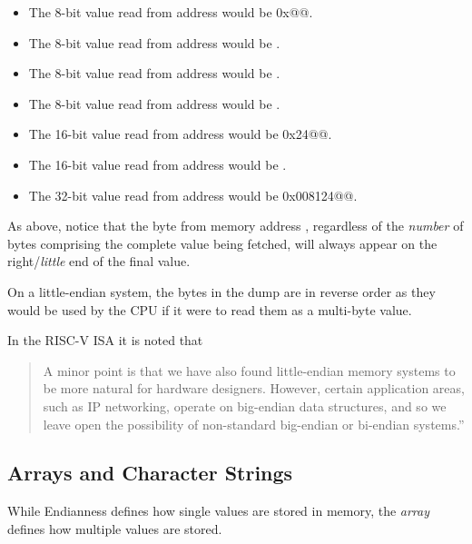 \begin{itemize}
\item The 8-bit value read from address \colorbox{c_lightgreen}{} would be \verb@0x@{\color{red}@}.
\item The 8-bit value read from address  would be .
\item The 8-bit value read from address  would be .
\item The 8-bit value read from address  would be .
\item The 16-bit value read from address \colorbox{c_lightgreen}{} would be \verb@0x24@{\color{red}@}.
\item The 16-bit value read from address  would be .
\item The 32-bit value read from address \colorbox{c_lightgreen}{} would be \verb@0x008124@{\color{red}@}.
\end{itemize}

As above, notice that the byte from memory address \colorbox{c_lightgreen}{}, 
regardless of the {\em number} of bytes comprising the complete value being 
fetched, will always appear on the right/{\em little} end of the final value.



\begin{tcolorbox}
On a little-endian system, the bytes in the dump are in reverse order as 
they would be used by the CPU if it were to read them as a multi-byte value.
\end{tcolorbox}


In the RISC-V ISA it is noted that 
\begin{quote}
A minor point is that we have also found 
little-endian memory systems to be more natural for hardware 
designers. However, certain application areas, such as IP networking, operate
on big-endian data structures, and so we leave open the possibility of 
non-standard big-endian or bi-endian systems.''\cite[p.~6]{rvismv1v22:2017}
\end{quote}

\subsection{Arrays and Character Strings}

While Endianness defines how single values are stored in memory,
the {\em array} defines how multiple values are stored.

